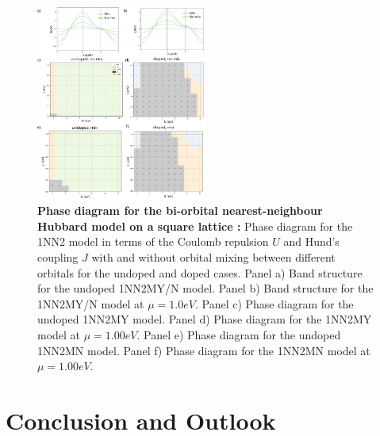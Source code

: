 \documentclass[12pt]{article}
\begin{document}
\begin{figure}[htbp]  %
    \centering
    \includegraphics[width=0.50\textwidth]{1NN2.png}  %
    \caption{\textbf{Phase diagram for the bi-orbital nearest-neighbour Hubbard model on a square lattice :} Phase diagram for the 1NN2 model in terms of 
    the Coulomb repulsion $U$ and Hund's coupling $J$ with and without orbital 
    mixing between different orbitals for the undoped and doped cases. Panel a) Band structure for the undoped 1NN2MY/N model. 
    Panel b) Band structure for the 1NN2MY/N model at $\mu =1.0eV$. 
    Panel c) Phase diagram for the undoped 1NN2MY model.
    Panel d) Phase diagram for the 1NN2MY model at $\mu =1.00eV$.
    Panel e) Phase diagram for the undoped 1NN2MN model.
    Panel f) Phase diagram for the 1NN2MN model at $\mu =1.00eV$.}
    \label{fig:1NN2pd}
\end{figure}
\newpage
\section{Conclusion and Outlook}
\end{document}
